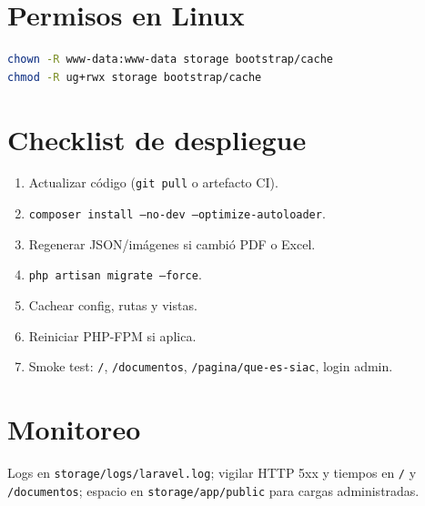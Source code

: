 \section{Permisos en Linux}
\begin{lstlisting}[language=bash]
chown -R www-data:www-data storage bootstrap/cache
chmod -R ug+rwx storage bootstrap/cache
\end{lstlisting}

\section{Checklist de despliegue}
\begin{enumerate}
  \item Actualizar código (\texttt{git pull} o artefacto CI).
  \item \texttt{composer install --no-dev --optimize-autoloader}.
  \item Regenerar JSON/imágenes si cambió PDF o Excel.
  \item \texttt{php artisan migrate --force}.
  \item Cachear config, rutas y vistas.
  \item Reiniciar PHP-FPM si aplica.
  \item Smoke test: \texttt{/}, \texttt{/documentos}, \texttt{/pagina/que-es-siac}, login admin.
\end{enumerate}

\section{Monitoreo}
Logs en \texttt{storage/logs/laravel.log}; vigilar HTTP 5xx y tiempos en \texttt{/} y \texttt{/documentos}; espacio en \texttt{storage/app/public} para cargas administradas.
